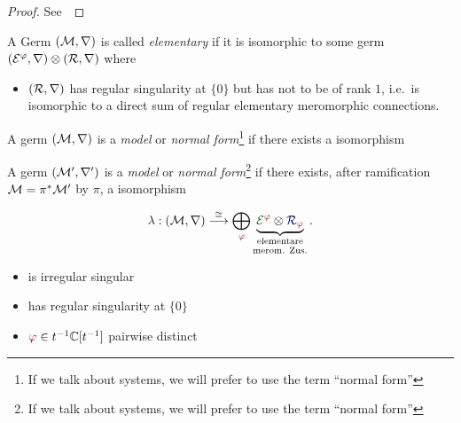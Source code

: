 \begin{proof}
  See~\cite[Prop.II.5.1]{sabbah2007isomonodromic}
\end{proof}
\begin{defn}
  A Germ $(\mathcal{M},\nabla)$ is called \emph{elementary} if it is isomorphic to
  some germ $(\mathcal{E}^\varphi,\nabla)\otimes(\mathcal{R},\nabla)$ where
  \begin{itemize}
    \item $(\mathcal{R},\nabla)$ has regular singularity at $\{0\}$ but has not to be
      of rank $1$, i.e.\ is isomorphic to a direct sum of regular elementary
      meromorphic connections.
  \end{itemize}
\end{defn}
\begin{defn} \label{defn:model}
  \def\myPhi{\textcolor{red!60!black}{\phi}}
  \def\myE{\textcolor{green!40!black}{\cE^{\myPhi}}}
  \begin{multicols}{2}
    A germ $(\mathcal{M},\nabla)$ is a \emph{model} or \emph{normal form}\footnote{If
    we talk about systems, we will prefer to use the term ``normal form''} if
    there exists a isomorphism

    \columnbreak{}

    A germ $(\mathcal{M}',\nabla')$ is a \emph{model} or \emph{normal form}\footnote{If
    we talk about systems, we will prefer to use the term ``normal form''} if
    there exists, after ramification $\mathcal{M}=\pi^*\mathcal{M}'$ by $\pi$, a isomorphism
  \end{multicols}
  \begin{multicols}{2}
    \[
      \lambda:(\cM,\nabla)
      \overset{\cong}{\longrightarrow}
      \bigoplus_{~\tikzmark{e3}\!\!\myPhi}
      \underset{\text{merom. Zus.}}{%
        \underset{\text{elementare}}{%
          \underbrace{%
            \overset{\tikzmark{e2}}{\myE}
            \otimes
            \overset{\tikzmark{e1}}{\textcolor{blue!40!black}{\cR_{\myPhi}}}
          }
        }
      }\,.
    \]
    \columnbreak{}
    \begin{itemize}
      \item[\tikzmarkb{n2}{green}] is irregular singular
      \item[\tikzmarkc{n1}{blue}] has regular singularity at $\{0\}$
      \item[\tikzmarkc{n3}{red}] $\myPhi\in t^{-1}\C[t^{-1}]$ pairwise distinct
    \end{itemize}
  \end{multicols}
\end{defn}
